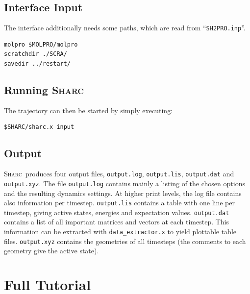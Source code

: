 \documentclass[a4paper,11pt,DIV=15,openany]{scrbook}
\newcommand{\sharc}{\textsc{Sharc}}
\newcommand{\ttt}[1]{\texttt{#1}}
\newenvironment{example}{
  \vspace{0mm}
  \definecolor{shadecolor}{HTML}{E4F4FF}
  \begin{shaded}
}{
  \end{shaded}
}
\begin{document}
\section{Interface Input}

The interface additionally needs some paths, which are read from ``\ttt{SH2PRO.inp}''.
\begin{example}\vspace{-8mm}
\begin{verbatim}
molpro $MOLPRO/molpro
scratchdir ./SCRA/
savedir ../restart/
\end{verbatim}\vspace{-5mm}
\end{example}

\section{Running \sharc}

The trajectory can then be started by simply executing:
\begin{example}\vspace{-8mm}
\begin{verbatim}
$SHARC/sharc.x input 
\end{verbatim}\vspace{-5mm}
\end{example}

\section{Output}

\sharc\ produces four output files, \ttt{output.log}, \ttt{output.lis}, \ttt{output.dat} and \ttt{output.xyz}. The file \ttt{output.log} contains mainly a listing of the chosen options and the resulting dynamics settings. At higher print levels, the log file contains also information per timestep. \ttt{output.lis} contains a table with one line per timestep, giving active states, energies and expectation values. \ttt{output.dat} contains a list of all important matrices and vectors at each timestep. This information can be extracted with \ttt{data\_extractor.x} to yield plottable table files. \ttt{output.xyz} contains the geometries of all timesteps (the comments to each geometry give the active state).





\chapter{Full Tutorial}\label{chap:full}
\end{document}
